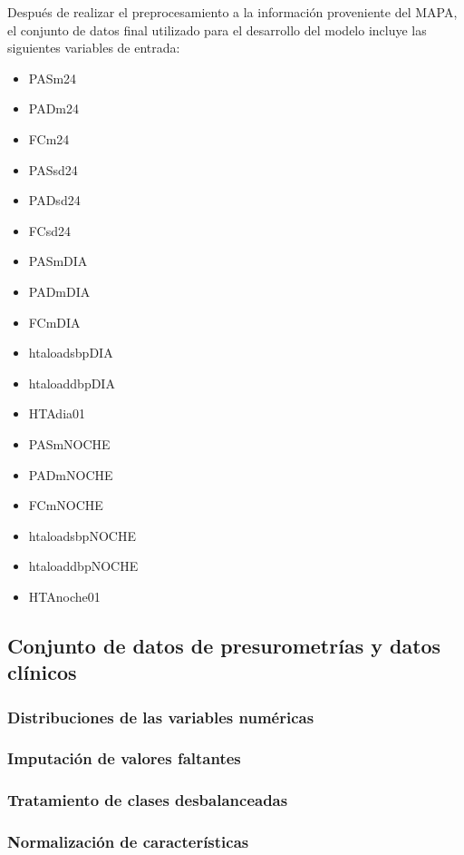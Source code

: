 Después de realizar el preprocesamiento a la información proveniente del MAPA, el conjunto 
de datos final utilizado para el desarrollo del modelo incluye las siguientes variables de entrada:

\begin{itemize}
	\item PASm24	
  \item PADm24
  \item FCm24
  \item PASsd24 
  \item PADsd24
  \item FCsd24
  \item PASmDIA
  \item PADmDIA
  \item FCmDIA
  \item htaloadsbpDIA 
  \item htaloaddbpDIA   
  \item HTAdia01	
  \item PASmNOCHE
  \item PADmNOCHE
  \item FCmNOCHE
  \item htaloadsbpNOCHE
  \item htaloaddbpNOCHE
  \item HTAnoche01
\end{itemize}



\subsection{Conjunto de datos de presurometrías y datos clínicos}
\label{sec:Conjunto2}

\subsubsection{Distribuciones de las variables numéricas}
\subsubsection{Imputación de valores faltantes}
\subsubsection{Tratamiento de clases desbalanceadas}
\subsubsection{Normalización de características}